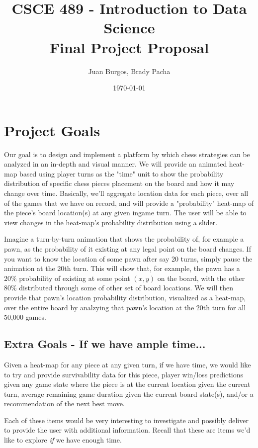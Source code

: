 \documentclass[a4paper,10pt,oneside,leqno,titlepage,onecolumn]{article}
\title{CSCE 489 - Introduction to Data Science \\ Final Project Proposal}
\author{Juan Burgos, Brady Pacha}
\date{\today}
\begin{document}
\maketitle

\section*{Project Goals}
Our goal is to design and implement a platform by which chess strategies can be analyzed 
in an in-depth and visual manner. We will provide an animated heat-map based using 
player turns as the "time" unit to show the probability distribution of specific chess 
pieces placement on the board and how it may change over time. Basically, we'll 
aggregate location data for each piece, over all of the games that we have on record, 
and will provide a "probability" heat-map of the piece's board location(s) at any given 
ingame turn. The user will be able to view changes in the heat-map's probability 
distribution using a slider.

Imagine a turn-by-turn animation that shows the probability of, for example a pawn, as 
the probability of it existing at any legal point on the board changes. If you want to 
know the location of some pawn after say 20 turns, simply pause the animation at the 
20th turn. This will show that, for example, the pawn has a 20\% probability of existing
at some point $(x,y)$ on the board, with the other 80\% distributed through some of 
other set of board locations. We will then provide that pawn's location probability 
distribution, visualized as a heat-map, over the entire board by analzying that pawn's 
location at the 20th turn for all 50,000 games.

\subsection*{Extra Goals - If we have ample time...}
Given a heat-map for any piece at any given turn, if we have time, we would like to try 
and provide survivability data for this piece, player win/loss predictions given any 
game state where the piece is at the current location given the current turn, average 
remaining game duration given the current board state(s), and/or a recommendation of the 
next best move.

Each of these items would be very interesting to investigate and possibly deliver to 
provide the user with additional information. Recall that these are items we'd like to 
explore \emph{if} we have enough time.
\end{document}
